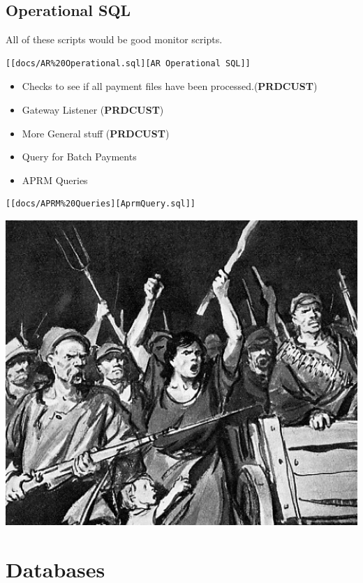 \documentclass[12pt,twoside]{article}
\begin{document}
\subsection{Operational SQL}
\label{sec:orgheadline68}
All of these scripts would be good monitor scripts.
\begin{verbatim}
[[docs/AR%20Operational.sql][AR Operational SQL]]
\end{verbatim}

\begin{itemize}
\item Checks to see if all payment files have been
processed.(\textbf{PRDCUST})
\item Gateway Listener (\textbf{PRDCUST})
\item More General stuff (\textbf{PRDCUST})
\item Query for Batch Payments
\end{itemize}
\begin{itemize}
\item APRM Queries
\end{itemize}
\begin{verbatim}
[[docs/APRM%20Queries][AprmQuery.sql]]
\end{verbatim}

\includegraphics[width=18cm]{Pictures/ironsmall.jpg}
\newpage
\section{Databases}
\label{sec:orgheadline163}
\end{document}
